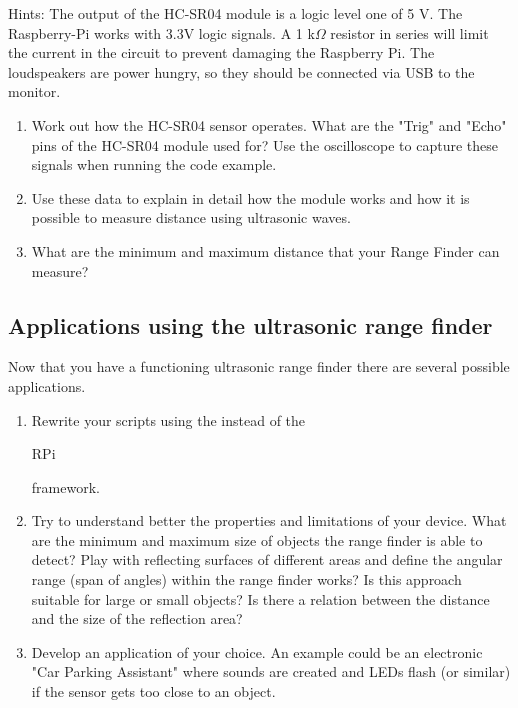 Hints: The output of the HC-SR04 module is a logic level one of 5 V. The Raspberry-Pi works with 3.3V logic signals. A 1 k$\Omega$ resistor in series will limit the current in the circuit to prevent damaging the Raspberry Pi. The loudspeakers are power hungry, so they  should be connected  via USB to the 
monitor.
 
\begin{enumerate}
\item 	Work out how the HC-SR04 sensor operates. What are the "Trig" and "Echo" pins of the HC-SR04 module used for? Use the oscilloscope to capture these signals when running the code example. 

\item Use these data to explain in detail how the module works and how it is possible to measure distance using ultrasonic waves.

\item What are the minimum and maximum distance that your Range Finder can measure? 
\end{enumerate}

\subsection{Applications using the ultrasonic range finder}

Now that you have a functioning ultrasonic range finder there are several possible applications.

\begin{enumerate}
\item  Rewrite  your scripts using the  \webiopi instead of the \begin{tt}RPi\end{tt} framework.

\item	Try to understand better the properties and limitations of your device. What are the minimum and maximum size of objects the range finder is able to detect? Play with reflecting surfaces of different areas and define the angular range (span of angles) within the range finder works? Is this approach suitable for large or small objects? Is there a relation between the distance and the size of the reflection area?

\item Develop an application of your choice. An example could be an electronic "Car Parking Assistant" where sounds are created and LEDs flash (or similar) if the sensor gets too close to an object.

\end{enumerate}

